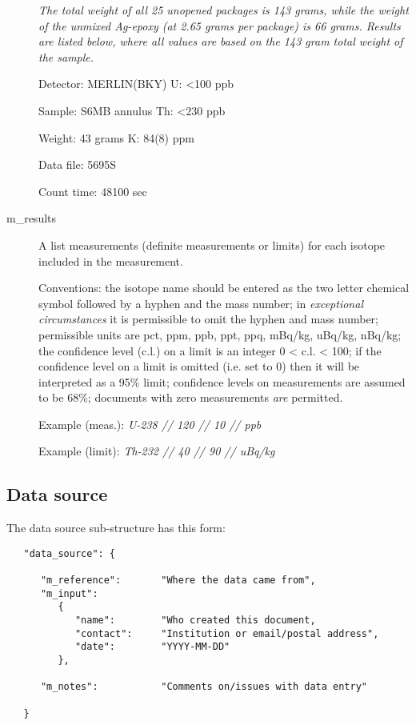 \documentclass[11pt, letterpaper]{article}
\begin{document}
\begin{description}
\textit{The total weight of all 25 unopened packages is 143 grams,
while the weight of the unmixed Ag-epoxy (at 2.65 grams per
package) is 66 grams.  Results are listed below, where all
values are based on the 143 gram total weight of the sample.}


     Detector:        MERLIN(BKY)             U:  <100    ppb
     
     Sample:          S6MB annulus           Th:  <230    ppb

     Weight:          43 grams               K:  84(8) ppm

     Data file:       5695S

     Count time:      48100 sec
 
  \item[m\_results] A list measurements (definite measurements or limits) for each isotope included in the measurement.
  
   Conventions: the isotope name should be entered as the two letter chemical symbol followed by a hyphen and the mass number; in \textit{exceptional circumstances} it is permissible to omit the hyphen and mass number; permissible units are pct, ppm, ppb, ppt, ppq, mBq/kg, uBq/kg, nBq/kg; the confidence level (c.l.) on a limit is an integer 0 < c.l. < 100; if the confidence level on a limit is omitted (i.e. set to 0) then it will be interpreted as a 95\% limit; confidence levels on measurements are assumed to be 68\%; documents with zero measurements \textit{are} permitted.
   
  Example (meas.): \textit{U-238 // 120 // 10 // ppb}  

  Example (limit): \textit{Th-232 // 40 // 90 // uBq/kg}
   
\end{description} 

\newpage
\subsection{Data source} %

The data source sub-structure has this form:

\begin{small}
\begin{verbatim}
   "data_source": {

      "m_reference":       "Where the data came from",
      "m_input":
         {
            "name":        "Who created this document, 
            "contact":     "Institution or email/postal address",
            "date":        "YYYY-MM-DD"
         },
      
      "m_notes":           "Comments on/issues with data entry"

   }
\end{verbatim}
\end{small}
\end{document}
